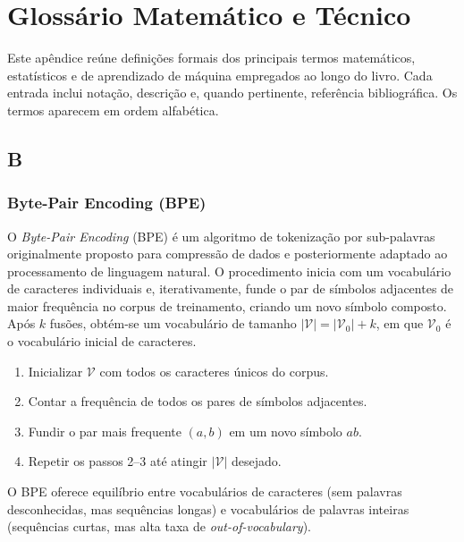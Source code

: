 \chapter{Glossário Matemático e Técnico}
\label{apendice:glossario_matematico}

Este apêndice reúne definições formais dos principais termos matemáticos,
estatísticos e de aprendizado de máquina empregados ao longo do livro.
Cada entrada inclui notação, descrição e, quando pertinente, referência
bibliográfica. Os termos aparecem em ordem alfabética.

\section*{B}

\subsection*{Byte-Pair Encoding (BPE)}
\label{sec:bpe}

O \textit{Byte-Pair Encoding} (BPE) é um algoritmo de tokenização por
sub-palavras originalmente proposto para compressão de dados e posteriormente
adaptado ao processamento de linguagem natural. O procedimento inicia com um
vocabulário de caracteres individuais e, iterativamente, funde o par de
símbolos adjacentes de maior frequência no corpus de treinamento, criando um
novo símbolo composto. Após $k$ fusões, obtém-se um vocabulário de tamanho
$|\mathcal{V}| = |\mathcal{V}_0| + k$, em que $\mathcal{V}_0$ é o vocabulário
inicial de caracteres.

\begin{enumerate}
  \item Inicializar $\mathcal{V}$ com todos os caracteres únicos do corpus.
  \item Contar a frequência de todos os pares de símbolos adjacentes.
  \item Fundir o par mais frequente $(a, b)$ em um novo símbolo $ab$.
  \item Repetir os passos 2–3 até atingir $|\mathcal{V}|$ desejado.
\end{enumerate}

O BPE oferece equilíbrio entre vocabulários de caracteres (sem palavras
desconhecidas, mas sequências longas) e vocabulários de palavras inteiras
(sequências curtas, mas alta taxa de \textit{out-of-vocabulary}).

